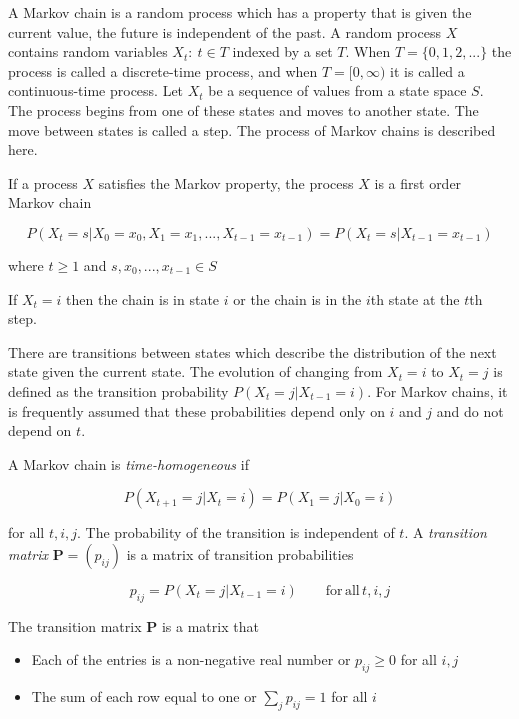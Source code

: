 A Markov chain is a random process which has a property that is given
the current value, the future is independent of the past. A random
process $X$ contains random variables $X_{t}:\:t\in T$ indexed by
a set $T$. When $T=\{0,1,2,...\}$ the process is called a discrete-time
process, and when $T=[0,\infty)$ it is called a continuous-time process.
Let $X_{t}$ be a sequence of values from a state space $S$. The
process begins from one of these states and moves to another state.
The move between states is called a step. The process of Markov chains
is described here.
\begin{defn}
\citep[p.214]{grimmett2001probability} If a process $X$ satisfies
the Markov property, the process $X$ is a first order Markov chain

\[
P(X_{t}=s|X_{0}=x_{0},X_{1}=x_{1},...,X_{t-1}=x_{t-1})=P(X_{t}=s|X_{t-1}=x_{t-1})
\]

where $t\ge1$ and $s,x_{0},...,x_{t-1}\in S$
\end{defn}
If $X_{t}=i$ then the chain is in state $i$ or the chain is in the
$i$th state at the $t$th step. 

There are transitions between states which describe the distribution
of the next state given the current state. The evolution of changing
from $X_{t}=i$ to $X_{t}=j$ is defined as the transition probability
$P(X_{t}=j|X_{t-1}=i)$. For Markov chains, it is frequently assumed
that these probabilities depend only on $i$ and $j$ and do not depend
on $t$.
\begin{defn}
\citep[p.214]{grimmett2001probability} A Markov chain is \emph{time-homogeneous}
if

\[
P(X_{t+1}=j|X_{t}=i)=P(X_{1}=j|X_{0}=i)
\]

for all $t,i,j$. The probability of the transition is independent
of $t$. A \emph{transition matrix} $\mathbf{P}=(p_{ij})$ is a matrix
of transition probabilities 

\[
p_{ij}=P(X_{t}=j|X_{t-1}=i)\qquad\mathrm{for}\,\mathrm{all\,}t,i,j
\]
\end{defn}
\begin{thm*}
\citep[p.215]{grimmett2001probability} The transition matrix $\mathbf{P}$
is a matrix that
\begin{itemize}
\item Each of the entries is a non-negative real number or $p_{ij}\ge0$
for all $i,j$
\item The sum of each row equal to one or $\sum_{j}p_{ij}=1$ for all $i$
\end{itemize}
\end{thm*}

